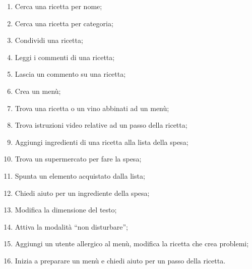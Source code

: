 \begin{enumerate}
 \item Cerca una ricetta per nome;
 \item Cerca una ricetta per categoria;
 \item Condividi una ricetta;
 \item Leggi i commenti di una ricetta;
 \item Lascia un commento su una ricetta;
 \item Crea un menù;
 \item Trova una ricetta o un vino abbinati ad un menù;
 \item Trova istruzioni video relative ad un passo della ricetta;
 \item Aggiungi ingredienti di una ricetta alla lista della spesa;
 \item Trova un supermercato per fare la spesa;
 \item Spunta un elemento acquistato dalla lista;
 \item Chiedi aiuto per un ingrediente della spesa;
 \item Modifica la dimensione del testo;
 \item Attiva la modalità ``non disturbare'';
 \item Aggiungi un utente allergico al menù, modifica la ricetta che crea problemi;
 \item Inizia a preparare un menù e chiedi aiuto per un passo della ricetta.
\end{enumerate}


